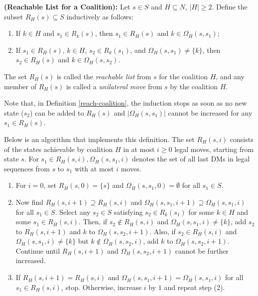 \begin{definition}\label{reach-coalition}
\rm {\bf (Reachable List for a Coalition):} Let $s \in S$ and $H \subseteq N$, $|H| \geq 2$. Define the subset $R_H(s) \subseteq S$ inductively as follows:

\begin{enumerate}[(1)]
\item If $k \in H$ and $s_1 \in R_k(s)$, then $s_1 \in R_H(s)$ and $k \in \Omega_H(s, s_1)$;
\item If $s_1 \in R_H(s)$, $k \in H$, $s_2 \in R_k(s_1)$, and $\Omega_H(s, s_1) \not = \{k\}$, then $s_2 \in R_H(s)$ and $k \in \Omega_H(s, s_2)$.
\end{enumerate}
The set $R_H(s)$ is called the \emph{reachable list} from $s$ for the coalition $H$, and any member of $R_H(s)$ is called a \emph{unilateral move} from $s$ by the coalition $H$.
\end{definition}

Note that, in Definition \ref{reach-coalition}, the induction stops as soon as no new state ($s_2$) can be added to $R_H(s)$ and $|\Omega_H(s, s_1)|$ cannot be increased for any $s_1 \in R_H(s)$.

Below is an algorithm that implements this definition. The set $R_H(s, i)$ consists of the states achievable by coalition $H$ in at most $i \ge 0$ legal moves, starting from state $s$. For $s_1 \in R_H(s, i), \Omega_H(s, s_1, i)$ denotes the set of all last DMs in legal sequences from $s$ to $s_1$ with at most $i$ moves.

\begin{enumerate}[(1)]
\item For $i=0$, set $R_H(s, 0) = \{s\}$ and $\Omega_H(s, s_1, 0) = \emptyset$ for all $s_1 \in S$.
\item Now find $R_H(s, i + 1) \supseteq R_H(s, i)$ and $\Omega_H(s, s_1, i + 1) \supseteq \Omega_H(s, s_1, i)$ for all $s_1 \in S$. Select any $s_2 \in S$ satisfying $s_2 \in R_k(s_1)$ for some $k \in H$ and some $s_1 \in R_H(s, i)$. Then, if $s_2 \not \in R_H(s, i)$ and $\Omega_H(s, s_1, i) \not = \{k\}$, add $s_2$ to $R_H(s, i + 1)$ and $k$ to  $\Omega_H(s, s_2, i+1)$. Also, if $s_2 \in R_H(s, i)$ and $\Omega_H(s, s_1, i) \not = \{k\}$ but $k \not \in \Omega_H(s, s_2, i)$, add $k$ to $\Omega_H(s, s_2, i+1)$. Continue until $R_H(s, i + 1)$ and $\Omega_H(s, s_2, i+1)$ cannot be further increased.
\item If $R_H(s, i + 1) = R_H(s, i)$ and $\Omega_H(s, s_1, i+1) = \Omega_H(s, s_1, i)$ for all $s_1 \in R_H(s, i)$, stop. Otherwise, increase $i$ by $1$ and repeat step (2).
\end{enumerate}

